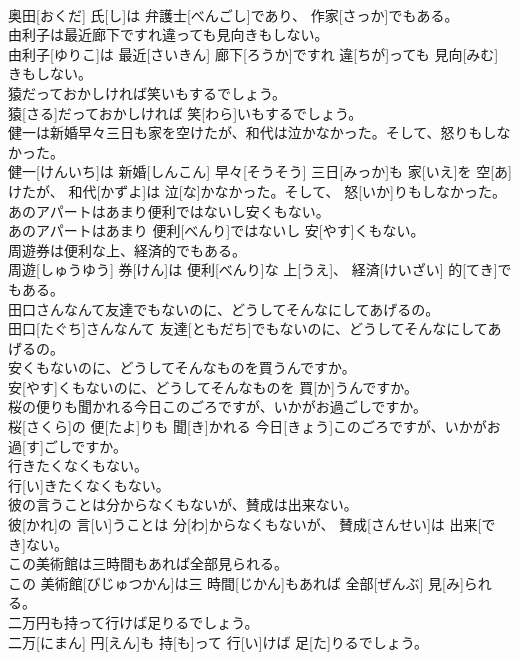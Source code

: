 \documentclass[8pt]{extreport}
\begin{document}
\begin{CJK}{UTF8}{min}
\\	奥田[おくだ] 氏[し]は 弁護士[べんごし]であり、 作家[さっか]でもある。
\\	由利子は最近廊下ですれ違っても見向きもしない。	
\\	由利子[ゆりこ]は 最近[さいきん] 廊下[ろうか]ですれ 違[ちが]っても 見向[みむ]きもしない。
\\	猿だっておかしければ笑いもするでしょう。	
\\	猿[さる]だっておかしければ 笑[わら]いもするでしょう。
\\	健一は新婚早々三日も家を空けたが、和代は泣かなかった。そして、怒りもしなかった。	
\\	健一[けんいち]は 新婚[しんこん] 早々[そうそう] 三日[みっか]も 家[いえ]を 空[あ]けたが、 和代[かずよ]は 泣[な]かなかった。そして、 怒[いか]りもしなかった。
\\	あのアパートはあまり便利ではないし安くもない。	
\\	あのアパートはあまり 便利[べんり]ではないし 安[やす]くもない。
\\	周遊券は便利な上、経済的でもある。	
\\	周遊[しゅうゆう] 券[けん]は 便利[べんり]な 上[うえ]、 経済[けいざい] 的[てき]でもある。
\\	田口さんなんて友達でもないのに、どうしてそんなにしてあげるの。	
\\	田口[たぐち]さんなんて 友達[ともだち]でもないのに、どうしてそんなにしてあげるの。
\\	安くもないのに、どうしてそんなものを買うんですか。	
\\	安[やす]くもないのに、どうしてそんなものを 買[か]うんですか。
\\	桜の便りも聞かれる今日このごろですが、いかがお過ごしですか。	
\\	桜[さくら]の 便[たよ]りも 聞[き]かれる 今日[きょう]このごろですが、いかがお 過[す]ごしですか。
\\	行きたくなくもない。	
\\	行[い]きたくなくもない。
\\	彼の言うことは分からなくもないが、賛成は出来ない。	
\\	彼[かれ]の 言[い]うことは 分[わ]からなくもないが、 賛成[さんせい]は 出来[でき]ない。
\\	この美術館は三時間もあれば全部見られる。	
\\	この 美術館[びじゅつかん]は三 時間[じかん]もあれば 全部[ぜんぶ] 見[み]られる。
\\	二万円も持って行けば足りるでしょう。	
\\	二万[にまん] 円[えん]も 持[も]って 行[い]けば 足[た]りるでしょう。

\end{CJK}
\end{document}
